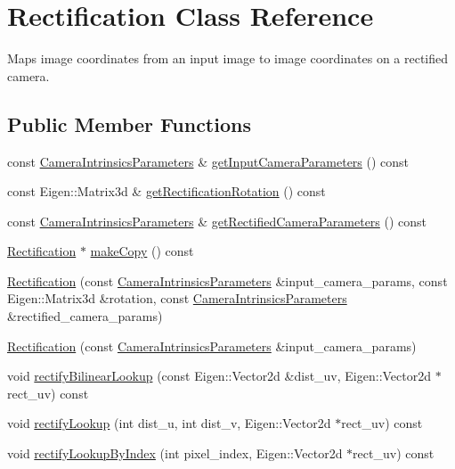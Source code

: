 \hypertarget{classfovis_1_1Rectification}{
\section{Rectification Class Reference}
\label{classfovis_1_1Rectification}
}


Maps image coordinates from an input image to image coordinates on a rectified camera.  


\subsection*{Public Member Functions}
\begin{DoxyCompactItemize}
\item 
const \hyperlink{structfovis_1_1CameraIntrinsicsParameters}{CameraIntrinsicsParameters} \& \hyperlink{classfovis_1_1Rectification_a26b289f3a9422898e0827833500f5a7f}{getInputCameraParameters} () const 
\item 
const Eigen::Matrix3d \& \hyperlink{classfovis_1_1Rectification_aad9df4b38b1c567ab56c3fceb1f51193}{getRectificationRotation} () const 
\item 
const \hyperlink{structfovis_1_1CameraIntrinsicsParameters}{CameraIntrinsicsParameters} \& \hyperlink{classfovis_1_1Rectification_ac3e99685d2431ad016434b13edf5a7e0}{getRectifiedCameraParameters} () const 
\item 
\hyperlink{classfovis_1_1Rectification}{Rectification} $\ast$ \hyperlink{classfovis_1_1Rectification_acd7ab855a169e8260203e83dc926e31c}{makeCopy} () const 
\item 
\hyperlink{classfovis_1_1Rectification_a850b5be87e72670261ef158a13a02606}{Rectification} (const \hyperlink{structfovis_1_1CameraIntrinsicsParameters}{CameraIntrinsicsParameters} \&input\_\-camera\_\-params, const Eigen::Matrix3d \&rotation, const \hyperlink{structfovis_1_1CameraIntrinsicsParameters}{CameraIntrinsicsParameters} \&rectified\_\-camera\_\-params)
\item 
\hyperlink{classfovis_1_1Rectification_a63a08ffa2c5fd3bf905f0a2949a14178}{Rectification} (const \hyperlink{structfovis_1_1CameraIntrinsicsParameters}{CameraIntrinsicsParameters} \&input\_\-camera\_\-params)
\item 
void \hyperlink{classfovis_1_1Rectification_a6ede2d21c8bfe048f16ec510e53bd7c7}{rectifyBilinearLookup} (const Eigen::Vector2d \&dist\_\-uv, Eigen::Vector2d $\ast$rect\_\-uv) const 
\item 
void \hyperlink{classfovis_1_1Rectification_a997ec4bb4cf597491445a8e42e183e5d}{rectifyLookup} (int dist\_\-u, int dist\_\-v, Eigen::Vector2d $\ast$rect\_\-uv) const 
\item 
void \hyperlink{classfovis_1_1Rectification_ac898654ec6adbc843e8e036736ae077f}{rectifyLookupByIndex} (int pixel\_\-index, Eigen::Vector2d $\ast$rect\_\-uv) const 
\end{DoxyCompactItemize}


